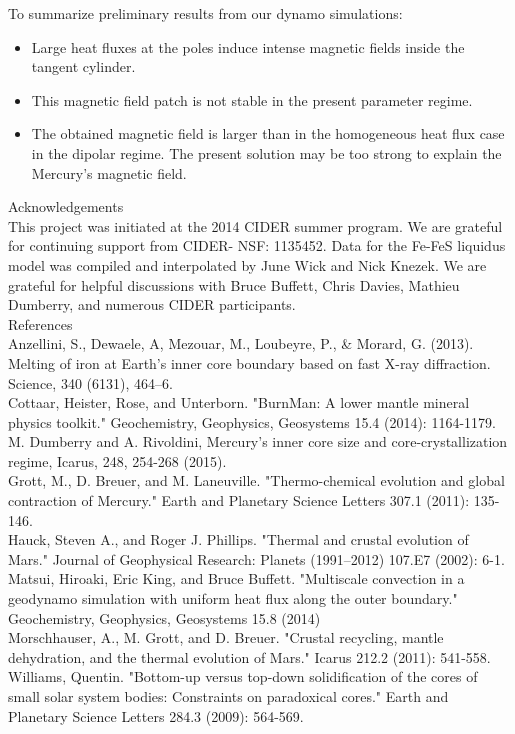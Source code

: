 \documentclass[landscape,a0b,final]{a0poster}
\begin{document}
\begin{multicols}{3}
To summarize preliminary results from our dynamo simulations:
\begin{itemize}
\item Large heat fluxes at the poles induce intense magnetic fields inside the tangent cylinder.
\item This magnetic field patch is not stable in the present parameter regime.
\item The obtained magnetic field is larger than in the homogeneous heat flux case in the dipolar regime. The present solution may be too strong to explain the Mercury's magnetic field.
\end{itemize}
\vspace{30pt}
{ \large Acknowledgements \\ \small
This project was initiated at the 2014 CIDER summer program.  We are grateful for continuing support from CIDER- NSF: 1135452.
Data for the Fe-FeS liquidus model was compiled and interpolated by June Wick and Nick Knezek.
We are grateful for helpful discussions with Bruce Buffett, Chris Davies, Mathieu Dumberry, and numerous CIDER participants.
}
\vspace{30pt}
\\
{ \large References \\ \tiny
Anzellini, S., Dewaele, A, Mezouar, M., Loubeyre, P., \& Morard, G. (2013). Melting of
iron at Earth's inner core boundary based on fast X-ray diffraction. Science,
340 (6131), 464–6.\\
Cottaar, Heister, Rose, and Unterborn. "BurnMan: A lower mantle mineral physics toolkit." Geochemistry, Geophysics, Geosystems 15.4 (2014): 1164-1179. \\
M. Dumberry and A. Rivoldini, Mercury's inner core size and core-crystallization regime, Icarus, 248, 254-268 (2015). \\
Grott, M., D. Breuer, and M. Laneuville. "Thermo-chemical evolution and global contraction of Mercury." Earth and Planetary Science Letters 307.1 (2011): 135-146. \\
Hauck, Steven A., and Roger J. Phillips. "Thermal and crustal evolution of Mars." Journal of Geophysical Research: Planets (1991–2012) 107.E7 (2002): 6-1. \\
Matsui, Hiroaki, Eric King, and Bruce Buffett. "Multiscale convection in a geodynamo simulation with uniform heat flux along the outer boundary." Geochemistry, Geophysics, Geosystems 15.8 (2014) \\
Morschhauser, A., M. Grott, and D. Breuer. "Crustal recycling, mantle dehydration, and the thermal evolution of Mars." Icarus 212.2 (2011): 541-558. \\
Williams, Quentin. "Bottom-up versus top-down solidification of the cores of small solar system bodies: Constraints on paradoxical cores." Earth and Planetary Science Letters 284.3 (2009): 564-569.
 }

\end{multicols}
\end{document}
